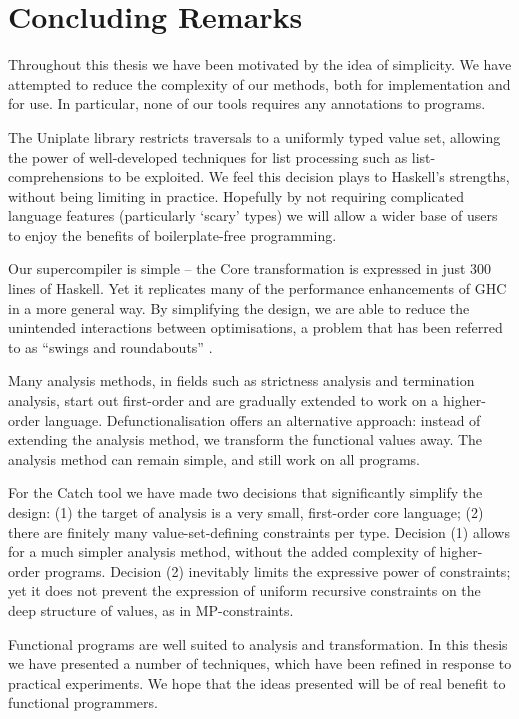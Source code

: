 \section{Concluding Remarks}
\label{secE:the_end}

Throughout this thesis we have been motivated by the idea of simplicity. We have attempted to reduce the complexity of our methods, both for implementation and for use. In particular, none of our tools requires any annotations to programs.

The Uniplate library restricts traversals to a uniformly typed value set, allowing the power of well-developed techniques for list processing such as list-comprehensions to be exploited. We feel this decision plays to Haskell's strengths, without being limiting in practice. Hopefully by not requiring complicated language features (particularly `scary' types) we will allow a wider base of users to enjoy the benefits of boilerplate-free programming.

Our supercompiler is simple -- the Core transformation is expressed in just 300 lines of Haskell. Yet it replicates many of the performance enhancements of GHC in a more general way. By simplifying the design, we are able to reduce the unintended interactions between optimisations, a problem that has been referred to as ``swings and roundabouts'' \cite{marlow:fast_curry}.

Many analysis methods, in fields such as strictness analysis and termination analysis, start out first-order and are gradually extended to work on a higher-order language. Defunctionalisation offers an alternative approach: instead of extending the analysis method, we transform the functional values away. The analysis method can remain simple, and still work on all programs.

For the Catch tool we have made two decisions that significantly simplify the design: (1) the target of analysis is a very small, first-order core language; (2) there are finitely many value-set-defining constraints per type. Decision (1) allows for a much simpler analysis method, without the added complexity of higher-order programs. Decision (2) inevitably limits the expressive power of constraints; yet it does not prevent the expression of uniform recursive constraints on the deep structure of values, as in MP-constraints.

Functional programs are well suited to analysis and transformation. In this thesis we have presented a number of techniques, which have been refined in response to practical experiments. We hope that the ideas presented will be of real benefit to functional programmers.
